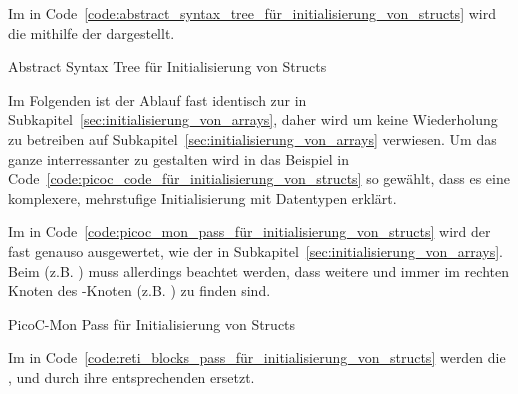 Im  in Code~\ref{code:abstract_syntax_tree_für_initialisierung_von_structs} wird die   mithilfe der   dargestellt.

\begin{code}
  \centering
  \caption{Abstract Syntax Tree für Initialisierung von Structs}
  \label{code:abstract_syntax_tree_für_initialisierung_von_structs}
\end{code}

Im Folgenden ist der Ablauf fast identisch zur  in Subkapitel~\ref{sec:initialisierung_von_arrays}, daher wird um keine Wiederholung zu betreiben auf Subkapitel~\ref{sec:initialisierung_von_arrays} verwiesen. Um das ganze interressanter zu gestalten wird in das Beispiel in Code~\ref{code:picoc_code_für_initialisierung_von_structs} so gewählt, dass es eine komplexere, mehrstufige Initialisierung mit  Datentypen erklärt.

Im  in Code~\ref{code:picoc_mon_pass_für_initialisierung_von_structs} wird der  fast genauso ausgewertet, wie der  in Subkapitel~\ref{sec:initialisierung_von_arrays}. Beim  (z.B. ) muss allerdings beachtet werden, dass weitere  und  immer im rechten  Knoten des -Knoten (z.B. ) zu finden sind.

\begin{code}
  \centering
  \caption{PicoC-Mon Pass für Initialisierung von Structs}
  \label{code:picoc_mon_pass_für_initialisierung_von_structs}
\end{code}

Im  in Code~\ref{code:reti_blocks_pass_für_initialisierung_von_structs} werden die  ,  und  durch ihre entsprechenden  ersetzt.

